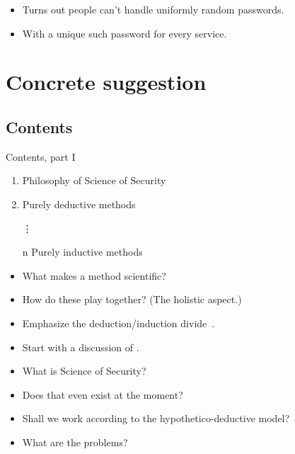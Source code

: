 \begin{frame}
  \begin{example}[Usability]
    \begin{itemize}
      \item Turns out people can't handle uniformly random passwords.
      \item With a unique such password for every service.
    \end{itemize}
  \end{example}
\end{frame}



\section{Concrete suggestion}

\subsection{Contents}

\begin{frame}
  \begin{block}{Contents, part I}
    \begin{enumerate}
      \item Philosophy of Science of Security
      \item Purely deductive methods
      \item[\vdots]
      \item[n] Purely inductive methods
    \end{enumerate}
  \end{block}

  \pause

  \begin{remark}
    \begin{itemize}
      \item What makes a method scientific?
      \item How do these play together? (The holistic aspect.)
      \item Emphasize the deduction/induction divide~\cite{SecurityAsAScience}.
    \end{itemize}
  \end{remark}
\end{frame}

\begin{frame}
  \begin{example}
    \begin{itemize}
      \item Start with a discussion of 
        .
      \item What is Science of Security?
      \item Does that even exist at the moment?
      \item Shall we work according to the hypothetico-deductive model?
      \item What are the problems?
    \end{itemize}
  \end{example}
\end{frame}

